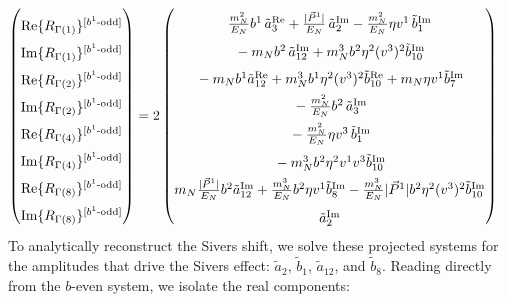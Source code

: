\begin{align}
    \begin{pmatrix}
        \rule{0pt}{16pt} \text{Re}\{ R_{\Gamma(1)}\}^{[b^{1}\text{-odd}]} \\
        \rule{0pt}{16pt} \text{Im}\{ R_{\Gamma(1)}\}^{[b^{1}\text{-odd}]} \\
        \rule{0pt}{16pt} \text{Re}\{ R_{\Gamma(2)}\}^{[b^{1}\text{-odd}]} \\
        \rule{0pt}{16pt} \text{Im}\{ R_{\Gamma(2)}\}^{[b^{1}\text{-odd}]} \\
        \rule{0pt}{16pt} \text{Re}\{ R_{\Gamma(4)}\}^{[b^{1}\text{-odd}]} \\
        \rule{0pt}{16pt} \text{Im}\{ R_{\Gamma(4)}\}^{[b^{1}\text{-odd}]} \\
        \rule{0pt}{16pt} \text{Re}\{ R_{\Gamma(8)}\}^{[b^{1}\text{-odd}]} \\
        \rule{0pt}{16pt} \text{Im}\{ R_{\Gamma(8)}\}^{[b^{1}\text{-odd}]}
    \end{pmatrix} &= 2\begin{pmatrix}
     \rule{0pt}{16pt}   \frac{\mN^2}{E_N} \bvec^1\, \tilde a^{\text{Re}}_3+\frac{|\vec{P}^1|}{E_N}\, \tilde a^{\text{Im}}_2- \frac{\mN^2}{E_N} \eta v^1\, \tilde b^{\text{Im}}_1\\
      \rule{0pt}{16pt}  -  \mN  \bvec^2 \, \tilde a^{\text{Im}}_{12}+  \mN^3  \bvec^2 \eta^2 (v^3)^2 \tilde b^{\text{Im}}_{10}\\
      \rule{0pt}{16pt}  
		-  \mN   \bvec^1  \tilde a^{\text{Re}}_{12}+ \mN^3  \bvec^1 \eta^2 (v^3)^2 \tilde b^{\text{Re}}_{10}+\mN \eta v^1  \tilde b^{\text{Im}}_7 \\
      \rule{0pt}{16pt}  -  \frac{\mN^2}{E_N} \bvec^2\, \tilde a^{\text{Im}}_3\\
      \rule{0pt}{16pt} -\frac{\mN^2}{E_N} \eta v^3\, \tilde b^{\text{Im}}_1\\
      \rule{0pt}{16pt}  -\mN^3 \bvec^2 \eta^2 v^1 v^3\tilde b^{\text{Im}}_{10}\\
      \rule{0pt}{16pt}    \mN  \frac{|\vec{P}^1|}{E_N} \bvec^2  \tilde a^{\text{Im}}_{12}+ \frac{  \mN^3}{E_N}  \bvec^2 \eta v^1  \tilde b^{\text{Im}}_8- \frac{ \mN^3}{E_N}  |\vec{P}^1| \bvec^2 \eta^2 (v^3)^2 \tilde b^{\text{Im}}_{10}\\
      \rule{0pt}{16pt} \tilde a^{\text{Im}}_2
    \end{pmatrix}
\end{align}
To analytically reconstruct the Sivers shift, we solve these projected systems for the amplitudes that drive the Sivers effect: $\tilde a_2$, $\tilde b_1$, $\tilde a_{12}$, and $\tilde b_8$. Reading directly from the $b$-even system, we isolate the real components:
